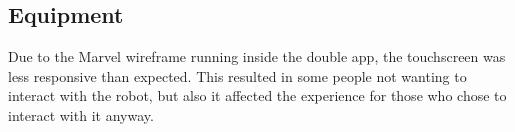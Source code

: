 \subsection{Equipment}
Due to the Marvel wireframe running inside the double app, the touchscreen was less responsive than expected. This resulted in some people not wanting to interact with the robot, but also it affected the experience for those who chose to interact with it anyway. 
